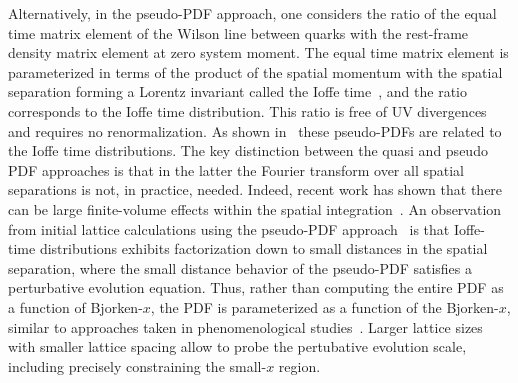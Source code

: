 Alternatively, in the pseudo-PDF approach, one considers the ratio of the equal time matrix element of the Wilson line between quarks with the rest-frame density matrix element at zero system moment. The equal time matrix element is parameterized in terms of the product of the spatial momentum with the spatial separation forming a Lorentz invariant called the Ioffe time~\cite{Ioffe:1969kf,Braun:1994jq}, and the ratio corresponds to the Ioffe time distribution.
This ratio is free of UV divergences and requires no renormalization. As shown in~\cite{Radyushkin:2016hsy,Radyushkin:2017cyf} these pseudo-PDFs are related to the Ioffe time distributions. The key distinction between the quasi and pseudo PDF approaches is that in the latter the Fourier transform over all spatial separations is not, in practice, needed. Indeed, recent work has shown that there can be large finite-volume effects within the spatial integration~\cite{Briceno:2018lfj}. An observation from initial lattice calculations using the pseudo-PDF approach~\cite{Karpie:2018zaz,Karpie:2018zaz}  is that Ioffe-time distributions exhibits factorization down to small distances in the spatial separation, where the small distance behavior of the pseudo-PDF  satisfies a perturbative  evolution equation. Thus, rather than computing the entire PDF as a function of Bjorken-$x$, the PDF is parameterized as a function of the Bjorken-$x$, similar to approaches taken in phenomenological studies~\cite{Ball:2017nwa,Accardi:2016qay}. Larger lattice sizes with smaller lattice spacing allow to probe the pertubative evolution scale, including precisely constraining the small-$x$ region.


